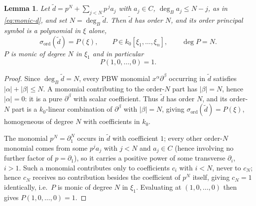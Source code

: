 \documentclass[11pt]{amsart}
\numberwithin{equation}{section}
\newtheorem{lemma}[theorem]{Lemma}
\theoremstyle{plain}
\theoremstyle{remark}
\begin{document}
\begin{lemma}\label{lem:order-symbol}
Let $\tilde d=p^N+\sum_{j<N}p^{\,j}a_j$ with $a_j\in C$, $\deg_Ba_j\le N-j$,
as in \eqref{eq:monic-d}, and set $N=\deg_B\tilde d$. Then $\tilde d$ has
order $N$, and its order principal symbol is a polynomial in $\xi$ alone,
\begin{equation} \sigma_{\mathrm{ord}}(\tilde d)=P(\xi),\qquad
 P\in k_0[\xi_1,\ldots,\xi_n],\qquad \deg P=N.
 \label{eq:P}\end{equation}
$P$ is monic of degree $N$ in $\xi_1$ and in particular
\begin{equation} P(1,0,\ldots,0)=1.
 \label{eq:P-e1}\end{equation}
\end{lemma}

\begin{proof}
Since $\deg_B\tilde d=N$, every PBW monomial $x^\alpha\partial^\beta$
occurring in $\tilde d$ satisfies $|\alpha|+|\beta|\le N$. A monomial
contributing to the order-$N$ part has $|\beta|=N$, hence $|\alpha|=0$: it
is a pure $\partial^\beta$ with scalar coefficient. Thus $\tilde d$ has
order $N$, and its order-$N$ part is a $k_0$-linear combination of
$\partial^\beta$ with $|\beta|=N$, giving $\sigma_{\mathrm{ord}}(\tilde
d)=P(\xi)$, homogeneous of degree $N$ with coefficients in $k_0$.

The monomial $p^N=\partial_1^N$ occurs in $\tilde d$ with coefficient $1$;
every other order-$N$ monomial comes from some $p^ja_j$ with $j<N$ and
$a_j\in C$ (hence involving no further factor of $p=\partial_1$), so it
carries a positive power of some transverse $\partial_i$, $i>1$. Such a
monomial contributes only to coefficients $c_i$ with $i<N$, never to
$c_N$; hence $c_N$ receives no contribution besides the coefficient of
$p^N$ itself, giving $c_N=1$ identically, i.e.\ $P$ is monic of degree $N$
in $\xi_1$. Evaluating at $(1,0,\ldots,0)$ then gives $P(1,0,\ldots,0)=1$.
\end{proof}
\end{document}
